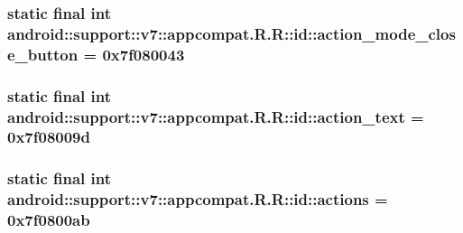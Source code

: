 \hypertarget{classandroid_1_1support_1_1v7_1_1appcompat_1_1_r_1_1id_2536e5d05175b63f1e4f23597e77c9f4}{
\subsubsection[{action\_\-mode\_\-close\_\-button}]{\setlength{\rightskip}{0pt plus 5cm}static final int android::support::v7::appcompat.R.R::id::action\_\-mode\_\-close\_\-button = 0x7f080043}}
\label{classandroid_1_1support_1_1v7_1_1appcompat_1_1_r_1_1id_2536e5d05175b63f1e4f23597e77c9f4}


\hypertarget{classandroid_1_1support_1_1v7_1_1appcompat_1_1_r_1_1id_0c9bfe422c320375f76e3fbc35b653ef}{
\subsubsection[{action\_\-text}]{\setlength{\rightskip}{0pt plus 5cm}static final int android::support::v7::appcompat.R.R::id::action\_\-text = 0x7f08009d}}
\label{classandroid_1_1support_1_1v7_1_1appcompat_1_1_r_1_1id_0c9bfe422c320375f76e3fbc35b653ef}


\hypertarget{classandroid_1_1support_1_1v7_1_1appcompat_1_1_r_1_1id_d13a9d8467291b56c52f86d34cd8f4f1}{
\subsubsection[{actions}]{\setlength{\rightskip}{0pt plus 5cm}static final int android::support::v7::appcompat.R.R::id::actions = 0x7f0800ab}}
\label{classandroid_1_1support_1_1v7_1_1appcompat_1_1_r_1_1id_d13a9d8467291b56c52f86d34cd8f4f1}


